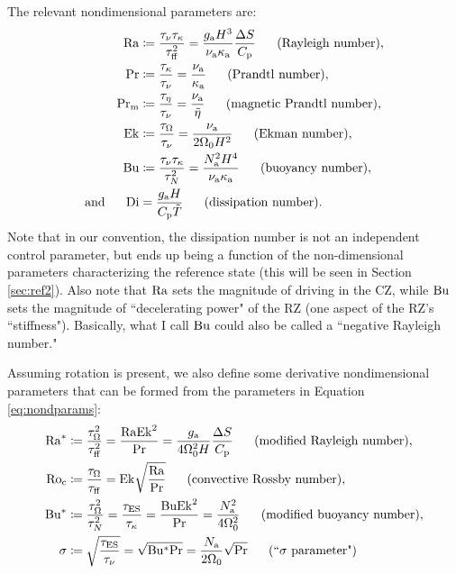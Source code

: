 \documentclass[12pt]{article}
\numberwithin{equation}{section}
\newcommand{\ga}{g_{\rm a}}
\newcommand{\nsqa}{N^2_{\rm a}}
\newcommand{\nua}{\nu_{\rm a}}
\newcommand{\kappaa}{\kappa_{\rm a}}
\begin{document}
	The relevant nondimensional parameters are:
	\begin{subequations}\label{eq:nondparams}
		\begin{align}
			\ra &\define \frac{\taunu\taukappa}{\tauff^2}=\frac{\ga H^3}{\nua \kappaa} \frac{\Delta S}{\cpcap}\five\text{(Rayleigh number)},\\ 
			\pr &\define \frac{\taukappa}{\taunu}=\frac{\nua}{\kappaa}\five\text{(Prandtl number)},\\
			\prm &\define \frac{\taueta}{\taunu}=\frac{\nua}{\tilde{\eta}}\five\text{(magnetic Prandtl number)},\\
			\ek &\define \frac{\tauomega}{\taunu}=\frac{\nua}{2\Omega_0H^2}\five\text{(Ekman number)},\\	
			\bu &\define \frac{\taunu\taukappa}{\taun^2}=\frac{\nsqa H^4}{\nua\kappaa}\five\text{(buoyancy number)},\\
			\andd \di &= \frac{\ga H}{\cpcap\tilde{T}}\five\text{(dissipation number)}.
		\end{align}
	\end{subequations}
	Note that in our convention, the dissipation number is not an independent control parameter, but ends up being a function of the non-dimensional parameters characterizing the reference state (this will be seen in Section \ref{sec:ref2}). Also note that ${\rm{Ra}}$ sets the magnitude of driving in the CZ, while ${\rm{Bu}}$ sets the magnitude of ``decelerating power" of the RZ (one aspect of the RZ's ``stiffness"). Basically, what I call ${\rm{Bu}}$ could also be called a ``negative Rayleigh number." 
	
	Assuming rotation is present, we also define some derivative nondimensional parameters that can be formed from the parameters in Equation \eqref{eq:nondparams}: 
	\begin{subequations}\label{eq:nondparams2}
	\begin{align}
		\ramod &\define \frac{\tauomega^2}{\tauff^2}=\frac{\ra\ek^2}{\pr}=\frac{\ga}{4\omnought^2H} \frac{\Delta S}{\cpcap}\five\text{(modified Rayleigh number)},\\ 
		\roc&\define \frac{\tauomega}{\tauff}=\ek\sqrt{\frac{\ra}{\pr}}\five\text{(convective Rossby number)},\\
		\bumod &\define \frac{\tauomega^2}{\taun^2}=\frac{\taues}{\taukappa}=\frac{\bu\ek^2}{\pr}=\frac{\nsqa}{4\omnought^2} \five\text{(modified buoyancy number)},\\ 
		\sigma &\define \sqrt{\frac{\taues}{\taunu}}=\sqrt{\bumod\pr} =\frac{N_{\rm a}}{2\omnought}\sqrt{\pr}\five\text{(``$\sigma$ parameter")}
		\end{align}
	\end{subequations}
\end{document}
